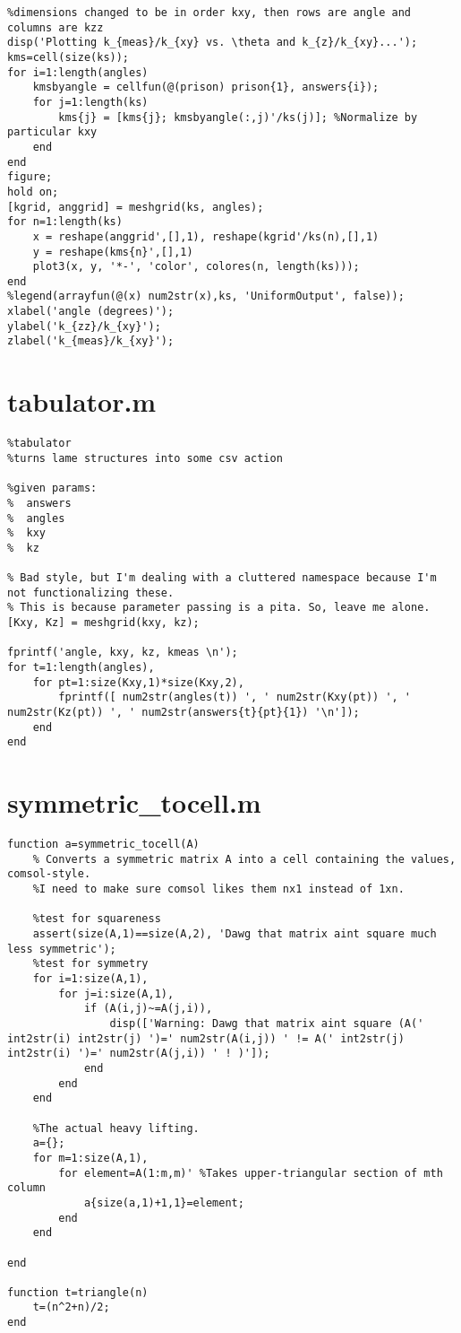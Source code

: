 \begin{verbatim}
%dimensions changed to be in order kxy, then rows are angle and columns are kzz
disp('Plotting k_{meas}/k_{xy} vs. \theta and k_{z}/k_{xy}...');
kms=cell(size(ks));
for i=1:length(angles)
    kmsbyangle = cellfun(@(prison) prison{1}, answers{i});
    for j=1:length(ks)
        kms{j} = [kms{j}; kmsbyangle(:,j)'/ks(j)]; %Normalize by particular kxy
    end
end
figure;
hold on;
[kgrid, anggrid] = meshgrid(ks, angles);
for n=1:length(ks)
    x = reshape(anggrid',[],1), reshape(kgrid'/ks(n),[],1)
    y = reshape(kms{n}',[],1)
    plot3(x, y, '*-', 'color', colores(n, length(ks)));
end
%legend(arrayfun(@(x) num2str(x),ks, 'UniformOutput', false));
xlabel('angle (degrees)');
ylabel('k_{zz}/k_{xy}');
zlabel('k_{meas}/k_{xy}');
\end{verbatim}
\normalsize

\section{tabulator.m}
\small
\begin{verbatim}
%tabulator
%turns lame structures into some csv action

%given params:
%  answers
%  angles
%  kxy
%  kz

% Bad style, but I'm dealing with a cluttered namespace because I'm not functionalizing these.
% This is because parameter passing is a pita. So, leave me alone.
[Kxy, Kz] = meshgrid(kxy, kz);

fprintf('angle, kxy, kz, kmeas \n');
for t=1:length(angles),
    for pt=1:size(Kxy,1)*size(Kxy,2),
        fprintf([ num2str(angles(t)) ', ' num2str(Kxy(pt)) ', ' num2str(Kz(pt)) ', ' num2str(answers{t}{pt}{1}) '\n']);
    end
end
\end{verbatim}
\normalsize

\section{symmetric_tocell.m}
\small
\begin{verbatim}
function a=symmetric_tocell(A)
    % Converts a symmetric matrix A into a cell containing the values, comsol-style.
    %I need to make sure comsol likes them nx1 instead of 1xn.

    %test for squareness
    assert(size(A,1)==size(A,2), 'Dawg that matrix aint square much less symmetric');
    %test for symmetry
    for i=1:size(A,1),
        for j=i:size(A,1),
            if (A(i,j)~=A(j,i)),
                disp(['Warning: Dawg that matrix aint square (A(' int2str(i) int2str(j) ')=' num2str(A(i,j)) ' != A(' int2str(j) int2str(i) ')=' num2str(A(j,i)) ' ! )']);
            end
        end
    end

    %The actual heavy lifting.
    a={};
    for m=1:size(A,1),
        for element=A(1:m,m)' %Takes upper-triangular section of mth column
            a{size(a,1)+1,1}=element;
        end
    end

end

function t=triangle(n)
    t=(n^2+n)/2;
end
\end{verbatim}
\normalsize

